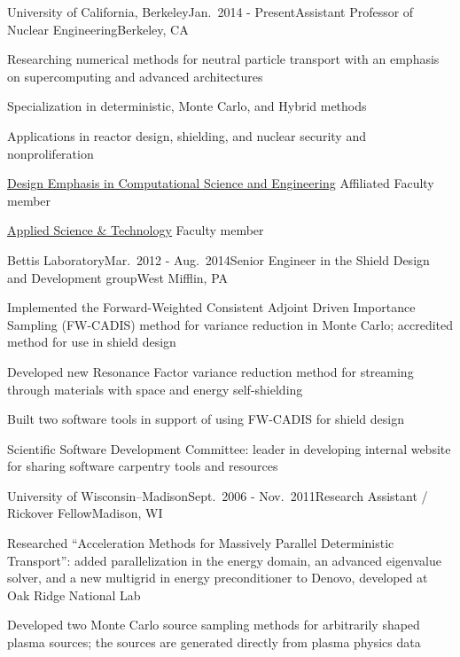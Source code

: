 \begin{rSubsection}{University of California, Berkeley}{Jan.\ 2014 - Present}{Assistant Professor of Nuclear Engineering}{Berkeley, CA}
\item Researching numerical methods for neutral particle transport with an emphasis on supercomputing and advanced architectures
\item Specialization in deterministic, Monte Carlo, and Hybrid methods
\item Applications in reactor design, shielding, and nuclear security and nonproliferation
\item \href{http://citris-uc.org/decse-mission/}{Design Emphasis  in Computational Science and Engineering} Affiliated Faculty member
\item \href{http://ast.coe.berkeley.edu/}{Applied Science \& Technology} Faculty member
\end{rSubsection}


\begin{rSubsection}{Bettis Laboratory}{Mar.\ 2012 - Aug.\ 2014}{Senior Engineer in the Shield Design and Development group}{West Mifflin, PA}
\item Implemented the Forward-Weighted Consistent Adjoint Driven Importance Sampling (FW-CADIS) method for variance reduction in Monte Carlo; accredited method for use in shield design
\item Developed new Resonance Factor variance reduction method for streaming through materials with space and energy self-shielding
\item Built two software tools in support of using FW-CADIS for shield design
\item Scientific Software Development Committee: leader in developing internal website for sharing software carpentry tools and resources
\end{rSubsection}


\begin{rSubsection}{University of Wisconsin--Madison}{Sept.\ 2006 - Nov.\ 2011}{Research Assistant / Rickover Fellow}{Madison, WI}
\item Researched “Acceleration Methods for Massively Parallel Deterministic Transport”: added parallelization in the energy domain, an advanced eigenvalue solver, and a new multigrid in energy preconditioner to Denovo, developed at Oak Ridge National Lab
\item Developed two Monte Carlo source sampling methods for arbitrarily shaped plasma sources; the sources are generated directly from plasma physics data
\end{rSubsection}

